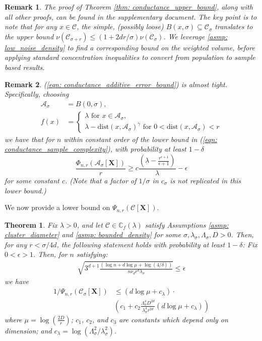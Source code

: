 \documentclass{article}
\newcommand{\1}{\mathbf{1}}
\newcommand{\dist}{\mathrm{dist}}
\newcommand{\Xbf}{\mathbf{X}}
\newcommand{\Cbb}{\mathbb{C}}
\newcommand{\Cset}{\mathcal{C}}
\newcommand{\Aset}{\mathcal{A}}
\newcommand{\Asig}{\Aset_{\sigma}}
\newcommand{\Csig}{\Cset_{\sigma}}
\theoremstyle{aldenthm}
\newtheorem{theorem}{Theorem}
\theoremstyle{aldenrmrk}
\newtheorem{remark}{Remark}
\begin{document}
\begin{remark}
	The proof of Theorem \ref{thm: conductance_upper_bound}, along with all other proofs, can be found in the supplementary document. The key point is to note that for any $x \in \Cset$, the simple, (possibly loose) $B(x,\sigma) \subseteq \Csig$ translates to the upper bound $\nu(\Cset_{\sigma + r}) \leq (1 + 2d r /\sigma)\nu(\Csig)$. We leverage \ref{asmp: low_noise_density} to find a corresponding bound on the weighted volume, before applying standard concentration inequalities to convert from population to sample based results.
\end{remark}
\begin{remark}
	(\ref{eqn: conductance_additive_error_bound}) is almost tight. Specifically, choosing
	\begin{align*}
	\Asig & = B(0,\sigma), \\
	 f(x) & = 
	 \begin{cases}
	 \lambda \text{ for $x \in \Asig$}, \\
	 \lambda - \dist(x,\Asig)^{\gamma} \text{ for $0 < \dist(x,\Asig) < r$}
	 \end{cases}
	\end{align*}
	we have that for $n$ within constant order of the lower bound in (\ref{eqn: conductance_sample_complexity}), with probability at least $1 - \delta$
	\begin{equation*}
	\frac{\Phi_{n,r}(\Asig[\mathbf{X}])}{r} \geq c \frac{(\lambda - \frac{r^{\epsilon+1}}{\epsilon+1})}{\lambda} - \epsilon
	\end{equation*}
	for some constant $c$. (Note that a factor of $1 / \sigma$ in $c_{\sigma}$ is not replicated in this lower bound.)
\end{remark}

We now provide a lower bound on $\Psi_{n,r}(\Cset[\Xbf])$.

\begin{theorem}
	\label{thm: inverse_mixing_time_lower_bound_nonconvex}
	Fix $\lambda > 0$, and let $\Cset \in \Cbb_f(\lambda)$ satisfy Assumptions \ref{asmp: cluster_diameter} and \ref{asmp: bounded_density} for some $\sigma, \lambda_{\sigma}, \Lambda_{\sigma}, D > 0$. Then, for any $r < \sigma/4d$, the following statement holds with probability at least $1 - \delta$: Fix $0 < \epsilon > 1$. Then, for $n$ satisfying:
	\begin{align*}
	\sqrt{3^{d+1}\frac{(\log n + d\log \mu + \log(4/\delta))}{n \nu_d r^d \lambda_{\sigma}}} \leq \epsilon
	\end{align*}
	we have
	\begin{align}
	\label{eqn: inverse_mixing_time_lower_bound_nonconvex}
	1 / \Psi_{n,r}(\Csig[\Xbf]) & \leq \left(d \log \mu + c_{\lambda} \right) \cdot \nonumber \\ 
	& \left(c_1 + c_2 \frac{\Lambda_{\sigma}^4D^{2d}}{\lambda_{\sigma}^4r^{2d}}\left(d \log \mu + c_{\lambda}\right)\right)
	\end{align}
	where $\mu = \log(\frac{2D}{r})$; $c_1$, $c_2$, and $c_3$ are constants which depend only on dimension; and $c_{\lambda} = \log(\Lambda_{\sigma}^2/ \lambda_{\sigma}^2)$. 
\end{theorem}
\end{document}
